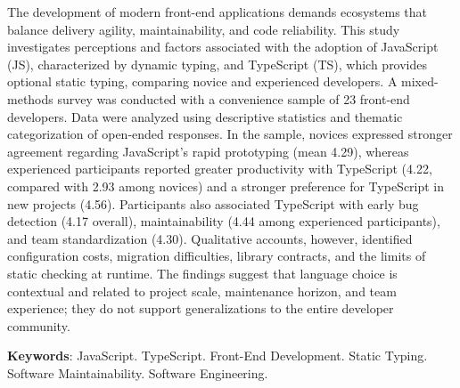 %
%

\begin{center}
\imprimirtitleenglish
\end{center}

\begin{resumo}[Abstract]
The development of modern front-end applications demands ecosystems that balance delivery agility, maintainability, and code reliability. This study investigates perceptions and factors associated with the adoption of JavaScript (JS), characterized by dynamic typing, and TypeScript (TS), which provides optional static typing, comparing novice and experienced developers. A mixed-methods survey was conducted with a convenience sample of 23 front-end developers. Data were analyzed using descriptive statistics and thematic categorization of open-ended responses. In the sample, novices expressed stronger agreement regarding JavaScript's rapid prototyping (mean 4.29), whereas experienced participants reported greater productivity with TypeScript (4.22, compared with 2.93 among novices) and a stronger preference for TypeScript in new projects (4.56). Participants also associated TypeScript with early bug detection (4.17 overall), maintainability (4.44 among experienced participants), and team standardization (4.30). Qualitative accounts, however, identified configuration costs, migration difficulties, library contracts, and the limits of static checking at runtime. The findings suggest that language choice is contextual and related to project scale, maintenance horizon, and team experience; they do not support generalizations to the entire developer community.

\vspace{\onelineskip}
\noindent
\textbf{Keywords}: JavaScript. TypeScript. Front-End Development. Static Typing. Software Maintainability. Software Engineering.
\end{resumo}
